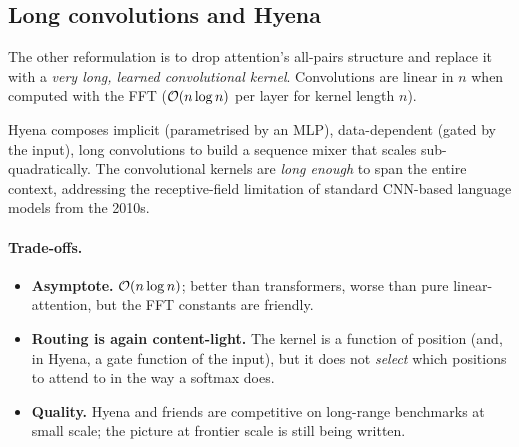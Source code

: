 \subsection{Long convolutions and Hyena}

The other reformulation is to drop attention's all-pairs structure and
replace it with a \emph{very long, learned convolutional kernel}.
Convolutions are linear in \(n\) when computed with the FFT
(\(\mathcal{O}(n \log n)\) per layer for kernel length \(n\)).

Hyena \citep{poli2023hyena} composes implicit (parametrised by an MLP),
data-dependent (gated by the input), long convolutions to build a sequence
mixer that scales sub-quadratically. The convolutional kernels are
\emph{long enough} to span the entire context, addressing the receptive-field
limitation of standard CNN-based language models from the 2010s.

\paragraph{Trade-offs.}
\begin{itemize}
\item \textbf{Asymptote.} \(\mathcal{O}(n \log n)\); better than transformers,
worse than pure linear-attention, but the FFT constants are friendly.
\item \textbf{Routing is again content-light.} The kernel is a function of
position (and, in Hyena, a gate function of the input), but it does not
\emph{select} which positions to attend to in the way a softmax does.
\item \textbf{Quality.} Hyena and friends are competitive on long-range
benchmarks at small scale; the picture at frontier scale is still being
written.
\end{itemize}

